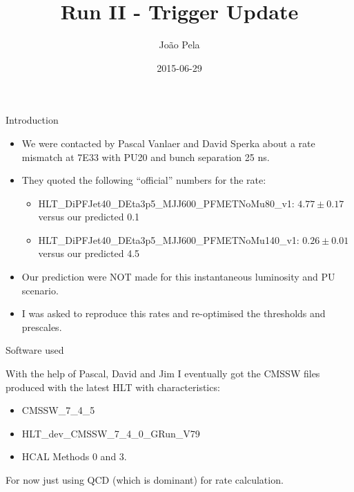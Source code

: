 \documentclass[8pt]{beamer}
\author[J. Pela]{João Pela}
\title{Run II - Trigger Update}
\institute[ICL]{Imperial College London}
\date{2015-06-29}
\begin{document}
\setlength{\unitlength}{1mm}

\begin{frame}
  \titlepage
\end{frame}

\begin{frame}{Introduction}

\begin{block}
  
\begin{itemize}
  \item We were contacted by Pascal Vanlaer and David Sperka about a rate mismatch at 7E33 with PU20 and bunch separation 25 ns.
  \item They quoted the following ``official'' numbers for the rate:
  \begin{itemize}
    \item HLT\_DiPFJet40\_DEta3p5\_MJJ600\_PFMETNoMu80\_v1: $4.77 \pm 0.17$ versus our predicted 0.1
    \item HLT\_DiPFJet40\_DEta3p5\_MJJ600\_PFMETNoMu140\_v1: $0.26 \pm 0.01$ versus our predicted 4.5
  \end{itemize}
  \item Our prediction were NOT made for this instantaneous luminosity and PU scenario.
  \item I was asked to reproduce this rates and re-optimised the thresholds and prescales.
\end{itemize}

\end{block}

\end{frame}

\begin{frame}{Software used}
  
With the help of Pascal, David and Jim I eventually got the CMSSW files produced with the latest HLT with characteristics: 
  
\begin{block}
  
\begin{itemize}
  \item CMSSW\_7\_4\_5
  \item HLT\_dev\_CMSSW\_7\_4\_0\_GRun\_V79
  \item HCAL Methods 0 and 3.
\end{itemize}
 
  
\end{block}

For now just using QCD (which is dominant) for rate calculation.

\end{frame}
\end{document}
